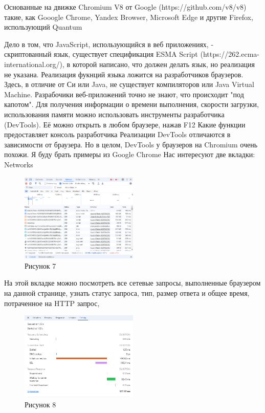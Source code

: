 \documentclass[12pt]{article}
\begin{document}
    Основанные на движке Chromium V8 от Google (https://github.com/v8/v8) такие, как Gooogle Chrome, Yandex Browser, Microsoft Edge и другие
    Firefox, использующий Quantum

    Дело в том, что JavaScript, использующийся в веб приложениях, - скриптованный язык, существует спецификация ESMA Script (https://262.ecma-international.org/), в которой написано, что должен делать язык, но реализация не указана. Реализация фукнций языка ложится на разработчиков браузеров. Здесь, в отличие от Си или Java, не существует компиляторов или Java Virtual Machine. Разрабочики веб-приложений точно не знают, что происходит "под капотом".
    Для получения информации о времени выполнения, скорости загрузки, использования памяти можно использовать инструменты разработчика (DevTools). Её можно открыть в любом браузере, нажав F12
    Какие функции предоставляет консоль разработчика
    Реализации DevTools отличаются в зависимости от браузера. Но в целом, DevTools у браузеров на Chromium очень похожи.
    Я буду брать примеры из Google Chrome
    Нас интересуют две вкладки:
    Networks
    \begin{figure}[h!]
        \centering
        \includegraphics[width=0.5\textwidth]{../images/network.png}
        \caption{Рисунок 7}
    \end{figure}

    На этой вкладке можно посмотреть все сетевые запросы, выполненные браузером на данной странице, узнать статус запроса, тип, размер ответа и общее время, потраченное на HTTP запрос,
    \begin{figure}[h!]
        \centering
        \includegraphics[width=0.5\textwidth]{../images/network__timing.png}
        \caption{Рисунок 8}
    \end{figure}
\end{document}
